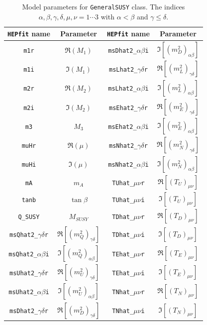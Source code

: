 \documentclass[preprint,3p,12pt]{elsarticle}
\newcommand{\HEPfit}{\texttt{HEPfit}\xspace}
\begin{document}
\begin{table}[t]
\begin{center}
\begin{tabular}{|c|c||c|c|}
\hline
\HEPfit name & Parameter & \HEPfit name & Parameter \\
\hline
\texttt{m1r} & $\Re(M_{1})$ & \texttt{msDhat2\_$\alpha\beta$i} & $\Im[(m_{D}^{2})_{\alpha\beta}]$ \\
\texttt{m1i} & $\Im(M_{1})$ & \texttt{msLhat2\_$\gamma\delta$r} & $\Re[(m_{L}^{2})_{\gamma\delta}]$ \\
\texttt{m2r} & $\Re(M_{2})$ & \texttt{msLhat2\_$\alpha\beta$i} & $\Im[(m_{L}^{2})_{\alpha\beta}]$ \\
\texttt{m2i} & $\Im(M_{2})$ & \texttt{msEhat2\_$\gamma\delta$r} & $\Re[(m_{E}^{2})_{\gamma\delta}]$  \\
\texttt{m3} &  $M_{3}$ & \texttt{msEhat2\_$\alpha\beta$i} & $\Im[(m_{E}^{2})_{\alpha\beta}]$ \\
\texttt{muHr} & $\Re(\mu)$ & \texttt{msNhat2\_$\gamma\delta$r} & $\Re[(m_{N}^{2})_{\gamma\delta}]$ \\
\texttt{muHi} & $\Im(\mu)$ & \texttt{msNhat2\_$\alpha\beta$i} & $\Im[(m_{N}^{2})_{\alpha\beta}]$  \\
\texttt{mA} & $m_{A}$ & \texttt{TUhat\_$\mu\nu$r} & $\Re[(T_{U})_{\mu\nu}]$ \\
\texttt{tanb} & $\tan\beta$ & \texttt{TUhat\_$\mu\nu$i} & $\Im[(T_{U})_{\mu\nu}]$ \\
\texttt{Q\_SUSY} & $M_{SUSY}$ & \texttt{TDhat\_$\mu\nu$r} & $\Re[(T_{D})_{\mu\nu}]$ \\
\texttt{msQhat2\_$\gamma\delta$r} & $\Re[(m_{Q}^{2})_{\gamma\delta}]$ & \texttt{TDhat\_$\mu\nu$i} & $\Im[(T_{D})_{\mu\nu}]$ \\
\texttt{msQhat2\_$\alpha\beta$i} & $\Im[(m_{Q}^{2})_{\alpha\beta}]$ & \texttt{TEhat\_$\mu\nu$r} & $\Re[(T_{E})_{\mu\nu}]$ \\
\texttt{msUhat2\_$\gamma\delta$r} & $\Re[(m_{U}^{2})_{\gamma\delta}]$ & \texttt{TEhat\_$\mu\nu$i} & $\Im[(T_{E})_{\mu\nu}]$\\
\texttt{msUhat2\_$\alpha\beta$i} & $\Im[(m_{U}^{2})_{\alpha\beta}]$ & \texttt{TNhat\_$\mu\nu$r} & $\Re[(T_{N})_{\mu\nu}]$ \\
\texttt{msDhat2\_$\gamma\delta$r} & $\Re[(m_{D}^{2})_{\gamma\delta}]$ & \texttt{TNhat\_$\mu\nu$i} & $\Im[(T_{N})_{\mu\nu}]$ \\ 
\hline
\end{tabular}
\end{center}
\caption{Model parameters for \texttt{GeneralSUSY} class. The indices $\alpha, \beta, \gamma, \delta, \mu, \nu = 1 \cdots 3$ with $\alpha<\beta$ and $\gamma \leq \delta$.}
\label{default}
\end{table}%
\end{document}
